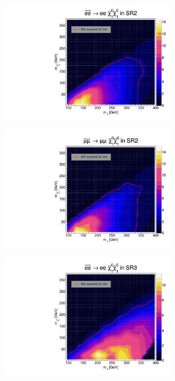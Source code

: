\documentclass[12pt, a4paper]{book}
\begin{document}
\begin{figure}[!ht]
\begin{subfigure}[b]{0.49\textwidth}
      \includegraphics[width=1\textwidth]{Limits/Model_independent/100-150/SlepSlep/SlepSlep_ee.pdf}
   \end{subfigure}
   \hfill
   \begin{subfigure}[b]{0.49\textwidth}
      \centering
      \includegraphics[width=1\textwidth]{Limits/Model_independent/100-150/SlepSlep/SlepSlep_uu.pdf}
   \end{subfigure}
   \hfill
	\begin{subfigure}[b]{0.49\textwidth}
      \centering
      \includegraphics[width=1\textwidth]{Limits/Model_independent/150/SlepSlep/SlepSlep_ee.pdf}

\end{subfigure}
\end{figure}
\end{document}
